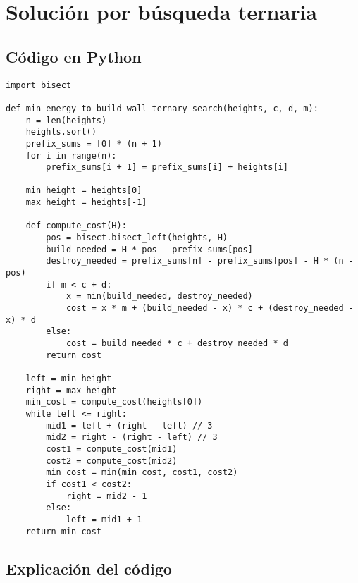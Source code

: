 \documentclass[a4paper,12pt]{article}
\begin{document}
\section{Solución por búsqueda ternaria}

\subsection{Código en Python}
\begin{lstlisting}
import bisect

def min_energy_to_build_wall_ternary_search(heights, c, d, m):
	n = len(heights)
	heights.sort()
	prefix_sums = [0] * (n + 1)
	for i in range(n):
		prefix_sums[i + 1] = prefix_sums[i] + heights[i]

	min_height = heights[0]
	max_height = heights[-1]

	def compute_cost(H):
		pos = bisect.bisect_left(heights, H)
		build_needed = H * pos - prefix_sums[pos]
		destroy_needed = prefix_sums[n] - prefix_sums[pos] - H * (n - pos)
		if m < c + d:
			x = min(build_needed, destroy_needed)
			cost = x * m + (build_needed - x) * c + (destroy_needed - x) * d
		else:
			cost = build_needed * c + destroy_needed * d
		return cost

	left = min_height
	right = max_height
	min_cost = compute_cost(heights[0])
	while left <= right:
		mid1 = left + (right - left) // 3
		mid2 = right - (right - left) // 3
		cost1 = compute_cost(mid1)
		cost2 = compute_cost(mid2)
		min_cost = min(min_cost, cost1, cost2)
		if cost1 < cost2:
			right = mid2 - 1
		else:
			left = mid1 + 1
	return min_cost

\end{lstlisting}


\subsection{Explicación del código}
\end{document}
